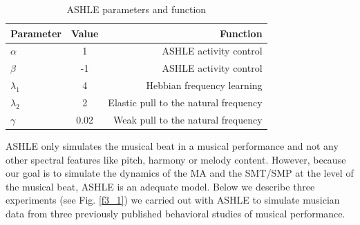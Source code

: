 \documentclass{report}
\begin{document}
\begin{table}
    \begin{center}
      \caption{ASHLE parameters and function}
      \label{tab:t3_1}
      \begin{tabular}{l|c|r}
        \textbf{Parameter} & \textbf{Value} & \textbf{Function}\\
        \hline
        $\alpha$ & 1 & ASHLE activity control\\
        \hline
        $\beta$ & -1 & ASHLE activity control\\
        \hline
        $\lambda_1$ & 4 & Hebbian frequency learning\\
        \hline
        $\lambda_2$ & 2 & Elastic pull to the natural frequency\\
        \hline
        $\gamma$ & 0.02 & Weak pull to the natural frequency\\
      \end{tabular}
    \end{center}   
\end{table}

ASHLE only simulates the musical beat in a musical performance and not any other spectral features like pitch, harmony or melody content. However, because our goal is to simulate the dynamics of the MA and the SMT/SMP at the level of the musical beat, ASHLE is an adequate model. Below we describe three experiments (see Fig.{} \ref{f3_1}) we carried out with ASHLE to simulate musician data from three previously published behavioral studies of musical performance.
\end{document}
